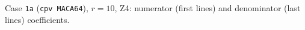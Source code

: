\begin{table}[H]
$$ $$\normalsize \caption{Case \texttt{1a} (\texttt{cpv MACA64}), $r=10$, Z4: numerator (first lines) and denominator (last lines) coefficients.} \label{tab:sym-1a-r10} \end{table}